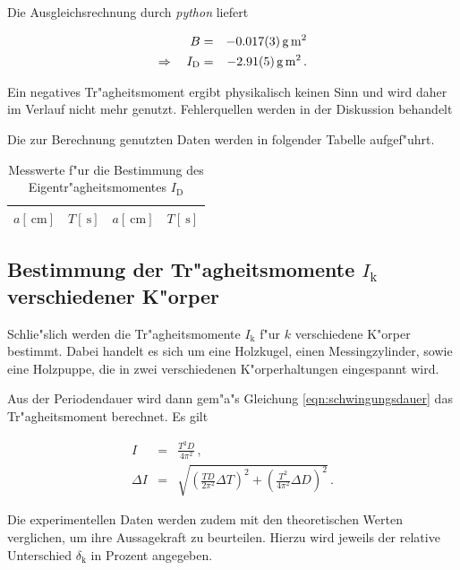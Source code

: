 		Die Ausgleichsrechnung durch \emph{python} liefert

		\begin{eqnarray*}
			B & = & \SI{-.017 (3)}{\gram \meter \squared} \\
			\Rightarrow \quad I_\mathrm{D} & = & \SI{-2.91 (5)}{\gram \meter \squared} \,.
		\end{eqnarray*}

		Ein negatives Tr"agheitsmoment ergibt physikalisch keinen Sinn und wird daher im Verlauf nicht mehr genutzt. Fehlerquellen werden in der Diskussion behandelt

		Die zur Berechnung genutzten Daten werden in folgender Tabelle aufgef"uhrt.

		\begin{table}[h!]
			\begin{center}
				\label{tabelle:winkelrichtgroesse}
				\caption{Messwerte f"ur die Bestimmung des Eigentr"agheitsmomentes $I_\mathrm{D}$}
				\begin{tabular}{|c|c||c|c|}
					\hline
					$a [\SI{}{\centi \meter}]$ & $T [\SI{}{\second}]$ & $a [\SI{}{\centi \meter}]$ & $T [\SI{}{\second}]$\\
					\hline 
					\hline
					
					\hline 
				\end{tabular}
			\end{center}
		\end{table}

		\subsection{Bestimmung der Tr"agheitsmomente $I_\mathrm{k}$ verschiedener K"orper}
		\label{subsec:versch_momente}
			Schlie"slich werden die Tr"agheitsmomente $I_\mathrm{k}$ f"ur $k$ verschiedene K"orper bestimmt.
			Dabei handelt es sich um eine Holzkugel, einen Messingzylinder, sowie eine Holzpuppe, die in zwei verschiedenen K"orperhaltungen eingespannt wird.

			Aus der Periodendauer wird dann gem"a"s Gleichung \eqref{eqn:schwingungsdauer} das Tr"agheitsmoment berechnet.
			Es gilt

			\begin{eqnarray*}
				I & = & \frac{T^2 D}{4 \pi^2} \,, \\
				\Delta I & = & \sqrt{\left(\frac{TD}{2 \pi^2} \Delta T\right)^2 + \left(\frac{T^2}{4 \pi^2} \Delta D\right)^2} \,.
			\end{eqnarray*}

			Die experimentellen Daten werden zudem mit den theoretischen Werten verglichen, um ihre Aussagekraft zu beurteilen.
			Hierzu wird jeweils der relative Unterschied $\delta_\mathrm{k}$ in Prozent angegeben.


